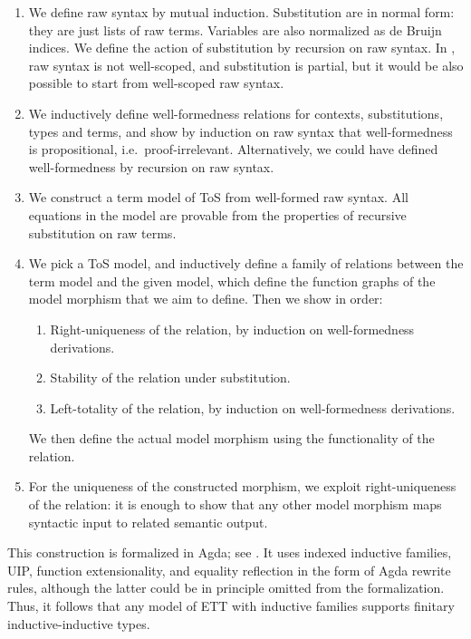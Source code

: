 \documentclass[12pt,a4paper,twoside,openany]{book}
\theoremstyle{remark}
\theoremstyle{definition}
\theoremstyle{theorem}
\begin{document}
\begin{enumerate}
\item We define raw syntax by mutual induction. Substitution are in normal form:
      they are just lists of raw terms. Variables are also normalized as de Bruijn indices.
      We define the action of substitution by recursion on raw syntax. In \cite{ind-ind-reduction},
      raw syntax is not well-scoped, and substitution is partial, but it would be also possible
      to start from well-scoped raw syntax.
\item We inductively define well-formedness relations for contexts,
      substitutions, types and terms, and show by induction on raw syntax that
      well-formedness is propositional, i.e.\ proof-irrelevant. Alternatively, we
      could have defined well-formedness by recursion on raw syntax.
\item We construct a term model of ToS from well-formed raw syntax. All equations in the model
      are provable from the properties of recursive substitution on raw terms.
\item We pick a ToS model, and inductively define a family of relations between
      the term model and the given model, which define the function graphs of the
      model morphism that we aim to define. Then we show in order:
      \begin{enumerate}
        \item Right-uniqueness of the relation, by induction on well-formedness derivations.
        \item Stability of the relation under substitution.
        \item Left-totality of the relation, by induction on well-formedness derivations.
      \end{enumerate}
      We then define the actual model morphism using the functionality of the relation.
\item For the uniqueness of the constructed morphism, we exploit
      right-uniqueness of the relation: it is enough to show that any other model
      morphism maps syntactic input to related semantic output.
\end{enumerate}

This construction is formalized in Agda; see \cite{ind-ind-reduction}. It uses
indexed inductive families, UIP, function extensionality, and equality
reflection in the form of Agda rewrite rules, although the latter could be in
principle omitted from the formalization. Thus, it follows that any model
of ETT with inductive families supports finitary inductive-inductive types.
\end{document}
